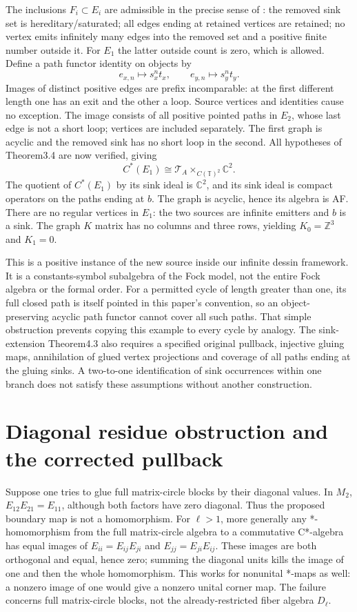 \documentclass[11pt,oneside,openany]{book}
\theoremstyle{definition}\newtheorem{definition}[theorem]{Definition}
\theoremstyle{remark}\newtheorem{remark}[theorem]{Remark}
\newcommand{\C}{\mathbb C}\newcommand{\Z}{\mathbb Z}\newcommand{\R}{\mathbb R}
\begin{document}
The inclusions $F_i\subset E_i$ are admissible in the precise sense of \cite[Definition3.1]{GraphPullbacks}: the removed sink set is hereditary/saturated; all edges ending at retained vertices are retained; no vertex emits infinitely many edges into the removed set and a positive finite number outside it. For $E_1$ the latter outside count is zero, which is allowed. Define a path functor identity on objects by
\[
 e_{x,n}\longmapsto s_x^nt_x,\qquad
 e_{y,n}\longmapsto s_y^nt_y.
\]
Images of distinct positive edges are prefix incomparable: at the first different length one has an exit and the other a loop. Source vertices and identities cause no exception. The image consists of all positive pointed paths in $E_2$, whose last edge is not a short loop; vertices are included separately. The first graph is acyclic and the removed sink has no short loop in the second. All hypotheses of Theorem3.4 are now verified, giving
\[
 C^*(E_1)\cong\mathcal T_A\mathop{\times}_{C(\mathbb T)^2}\C^2.
\]
The quotient of $C^*(E_1)$ by its sink ideal is $\C^2$, and its sink ideal is compact operators on the paths ending at $b$. The graph is acyclic, hence its algebra is AF. There are no regular vertices in $E_1$: the two sources are infinite emitters and $b$ is a sink. The graph $K$ matrix has no columns and three rows, yielding $K_0=\Z^3$ and $K_1=0$.

This is a positive instance of the new source inside our infinite dessin framework. It is a constants-symbol subalgebra of the Fock model, not the entire Fock algebra or the formal order. For a permitted cycle of length greater than one, its full closed path is itself pointed in this paper's convention, so an object-preserving acyclic path functor cannot cover all such paths. That simple obstruction prevents copying this example to every cycle by analogy. The sink-extension Theorem4.3 also requires a specified original pullback, injective gluing maps, annihilation of glued vertex projections and coverage of all paths ending at the gluing sinks. A two-to-one identification of sink occurrences within one branch does not satisfy these assumptions without another construction.

\section{Diagonal residue obstruction and the corrected pullback}
Suppose one tries to glue full matrix-circle blocks by their diagonal values. In $M_2$, $E_{12}E_{21}=E_{11}$, although both factors have zero diagonal. Thus the proposed boundary map is not a homomorphism. For $\ell>1$, more generally any *-homomorphism from the full matrix-circle algebra to a commutative C*-algebra has equal images of $E_{ii}=E_{ij}E_{ji}$ and $E_{jj}=E_{ji}E_{ij}$. These images are both orthogonal and equal, hence zero; summing the diagonal units kills the image of one and then the whole homomorphism. This works for nonunital *-maps as well: a nonzero image of one would give a nonzero unital corner map. The failure concerns full matrix-circle blocks, not the already-restricted fiber algebra $D_\ell$.
\end{document}

